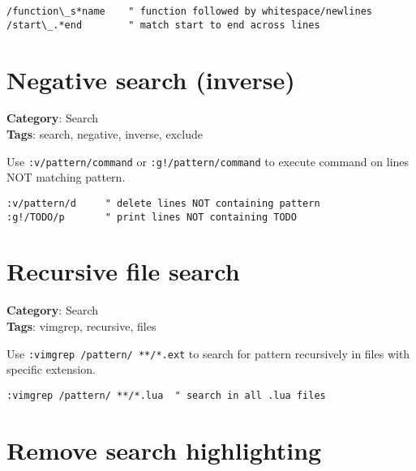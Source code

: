 {{{{{{{{{{{{\begin{Exa*}{}
\begin{Verbatim}[fontsize=\footnotesize, breaklines, breakanywhere]
/function\_s*name    " function followed by whitespace/newlines
/start\_.*end        " match start to end across lines
\end{Verbatim}
\end{Exa*}

\section{Negative search (inverse)}

\textbf{Category}: Search\\ \textbf{Tags}: search, negative, inverse, exclude
\vspace{0.5cm}

Use {\footnotesize \Verb§:v/pattern/command§} or {\footnotesize \Verb§:g!/pattern/command§} to execute command on lines NOT matching pattern.

\begin{Exa*}{}
\begin{Verbatim}[fontsize=\footnotesize, breaklines, breakanywhere]
:v/pattern/d     " delete lines NOT containing pattern
:g!/TODO/p       " print lines NOT containing TODO
\end{Verbatim}
\end{Exa*}

\section{Recursive file search}

\textbf{Category}: Search\\ \textbf{Tags}: vimgrep, recursive, files
\vspace{0.5cm}

Use {\footnotesize \Verb§:vimgrep /pattern/ **/*.ext§} to search for pattern recursively in files with specific extension.

\begin{Exa*}{}
\begin{Verbatim}[fontsize=\footnotesize, breaklines, breakanywhere]
:vimgrep /pattern/ **/*.lua  " search in all .lua files
\end{Verbatim}
\end{Exa*}

\section{Remove search highlighting}

}}}}}}}}}}}}
